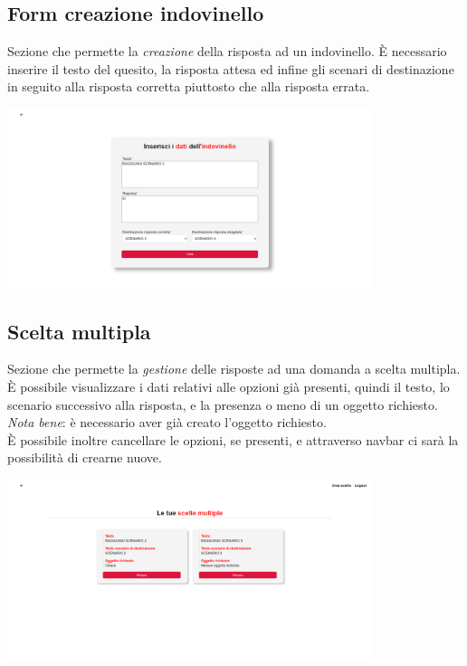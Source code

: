 \documentclass{article}
\begin{document}
\subsection*{Form creazione indovinello}
Sezione che permette la \textit{creazione} della risposta ad un indovinello. È necessario inserire il testo del quesito, la risposta attesa ed infine gli scenari di destinazione in seguito alla risposta corretta piuttosto che alla risposta errata.
\begin{center}
    \includegraphics[width=0.8\textwidth]{foto16.png}
\end{center}

\subsection*{Scelta multipla}
Sezione che permette la \textit{gestione} delle risposte ad una domanda a scelta multipla. È possibile visualizzare i dati relativi alle opzioni già presenti, quindi il testo, lo scenario successivo alla risposta, e la presenza o meno di un oggetto richiesto.\vspace*{7pt}\\
\textit{Nota bene}: è necessario aver già creato l'oggetto richiesto.\vspace*{7pt}\\
È possibile inoltre cancellare le opzioni, se presenti, e attraverso navbar ci sarà la possibilità di crearne nuove.
\begin{center}
    \includegraphics[width=0.8\textwidth]{foto17.png}
\end{center}
\end{document}
